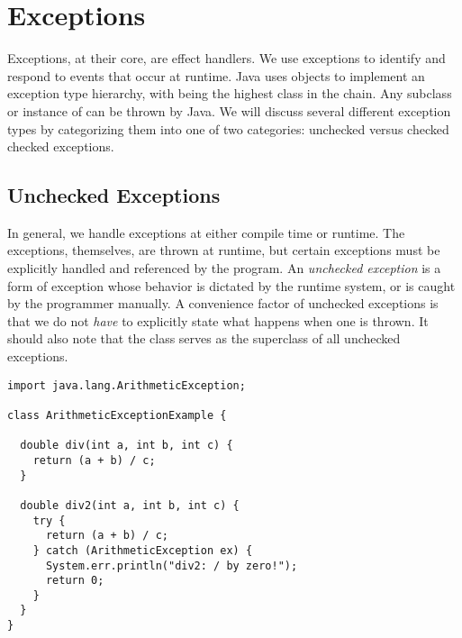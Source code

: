 \section{Exceptions}

Exceptions, at their core, are effect handlers. We use exceptions to identify and respond to events that occur at runtime. Java uses objects to implement an exception type hierarchy, with  being the highest class in the chain. Any subclass or instance of  can be thrown by Java. We will discuss several different exception types by categorizing them into one of two categories: unchecked versus checked checked exceptions.

\subsection{Unchecked Exceptions}
In general, we handle exceptions at either compile time or runtime. The exceptions, themselves, are thrown at runtime, but certain exceptions must be explicitly handled and referenced by the program. An \emph{unchecked exception} is a form of exception whose behavior is dictated by the runtime system, or is caught by the programmer manually. A convenience factor of unchecked exceptions is that we do not \emph{have} to explicitly state what happens when one is thrown. It should also note that the  class serves as the superclass of all unchecked exceptions.


\begin{lstlisting}[language=MyJava]
import java.lang.ArithmeticException;

class ArithmeticExceptionExample {
  
  double div(int a, int b, int c) {
    return (a + b) / c;
  }

  double div2(int a, int b, int c) {
    try {
      return (a + b) / c;
    } catch (ArithmeticException ex) {
      System.err.println("div2: / by zero!");
      return 0;
    }
  }
} 
\end{lstlisting}

